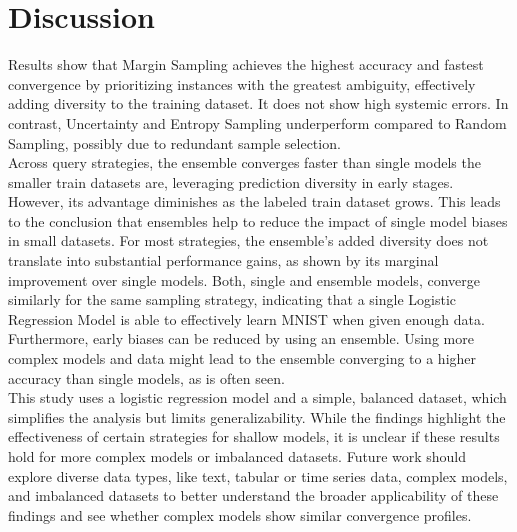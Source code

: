 \documentclass{article}
\theoremstyle{plain}
\theoremstyle{definition}
\theoremstyle{remark}
\begin{document}
\section{Discussion}\label{sec:discussion}
Results show that Margin Sampling achieves the highest accuracy and fastest convergence by prioritizing instances with the greatest ambiguity, effectively adding diversity to the training dataset. It does not show high systemic errors. In contrast, Uncertainty and Entropy Sampling underperform compared to Random Sampling, possibly due to redundant sample selection. \\
Across query strategies, the ensemble converges faster than single models the smaller train datasets are, leveraging prediction diversity in early stages. However, its advantage diminishes as the labeled train dataset grows. This leads to the conclusion that ensembles help to reduce the impact of single model biases in small datasets. For most strategies, the ensemble's added diversity does not translate into substantial performance gains, as shown by its marginal improvement over single models. Both, single and ensemble models, converge similarly for the same sampling strategy, indicating that a single Logistic Regression Model is able to effectively learn MNIST when given enough data. Furthermore, early biases can be reduced by using an ensemble. Using more complex models and data might lead to the ensemble converging to a higher accuracy than single models, as is often seen. \\
This study uses a logistic regression model and a simple, balanced dataset, which simplifies the analysis but limits generalizability. While the findings highlight the effectiveness of certain strategies for shallow models, it is unclear if these results hold for more complex models or imbalanced datasets.
Future work should explore diverse data types, like text, tabular or time series data, complex models, and imbalanced datasets to better understand the broader applicability of these findings and see whether complex models show similar convergence profiles.
\end{document}
